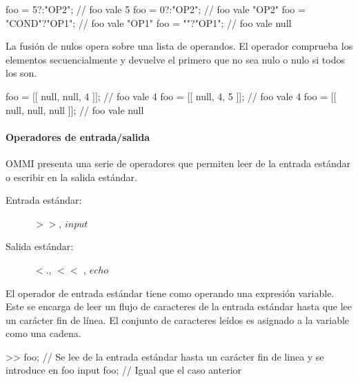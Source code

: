 \begin{myverbatim}
   foo = 5?:"OP2"; // foo vale 5
   foo = 0?:"OP2"; // foo vale "OP2"
   foo = "COND"?"OP1"; // foo vale "OP1"
   foo = ""?"OP1"; // foo vale null
\end{myverbatim} 

La fusión de nulos opera sobre una lista de operandos. El operador comprueba los elementos secuencialmente y devuelve el primero que no sea nulo o nulo si todos los son. \\

\begin{myverbatim}
   foo = [[ null, null, 4 ]]; // foo vale 4
   foo = [[ null, 4, 5 ]]; // foo vale 4
   foo = [[ null, null, null ]]; // foo vale null
\end{myverbatim}


\paragraph{Operadores de entrada/salida} \label{sec:op_io}
OMMI presenta una serie de operadores que permiten leer de la entrada estándar o
escribir en la salida estándar.

\begin{description}
\item [Entrada estándar:] $>>$, $input$
\item [Salida estándar:] $<.$, $<<$ , $echo$
\end{description} 

El operador de entrada estándar tiene como operando una expresión variable. Este se encarga de leer un flujo de caracteres de
la entrada estándar hasta que lee un carácter fin de línea. El conjunto de caracteres leídos es asignado a la variable como
una cadena. \\

\begin{myverbatim}
   >> foo; // Se lee de la entrada estándar hasta un carácter fin de linea y se introduce en foo
   input foo; // Igual que el caso anterior
\end{myverbatim}

